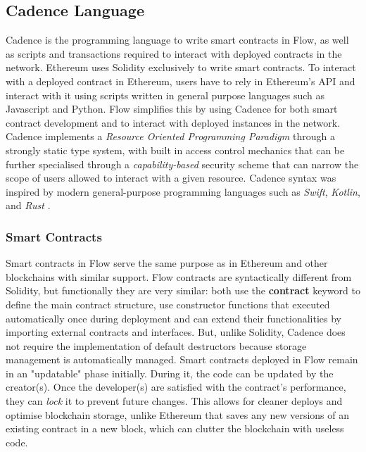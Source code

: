 \documentclass[../NFTComp_IEEE.tex]{subfiles}
\begin{document}
\subsection{Cadence Language}
\label{sec:cadence_language}
Cadence is the programming language to write smart contracts in Flow, as well as scripts and transactions required to interact with deployed contracts in the network. Ethereum uses Solidity exclusively to write smart contracts. To interact with a deployed contract in Ethereum, users have to rely in Ethereum's API and interact with it using scripts written in general purpose languages such as Javascript and Python. Flow simplifies this by using Cadence for both smart contract development and to interact with deployed instances in the network. Cadence implements a \textit{Resource Oriented Programming Paradigm} through a strongly static type system, with built in access control mechanics that can be further specialised through a \textit{capability-based} security scheme that can narrow the scope of users allowed to interact with a given resource. Cadence syntax was inspired by modern general-purpose programming languages such as \textit{Swift}, \textit{Kotlin}, and \textit{Rust} \cite{flow2020a} \cite{Cadence2023}.

\subsubsection{Smart Contracts}
\label{sec:smart_contracts}
Smart contracts in Flow serve the same purpose as in Ethereum and other blockchains with similar support. Flow contracts are syntactically different from Solidity, but functionally they are very similar: both use the \textbf{contract} keyword to define the main contract structure, use constructor functions that executed automatically once during deployment and can extend their functionalities by importing external contracts and interfaces. But, unlike Solidity, Cadence does not require the implementation of default destructors because storage management is automatically managed. Smart contracts deployed in Flow remain in an "updatable" phase initially. During it, the code can be updated by the creator(s). Once the developer(s) are satisfied with the contract's performance, they can \textit{lock} it to prevent future changes. This allows for cleaner deploys and optimise blockchain storage, unlike Ethereum that saves any new versions of an existing contract in a new block, which can clutter the blockchain with useless code.
\end{document}
